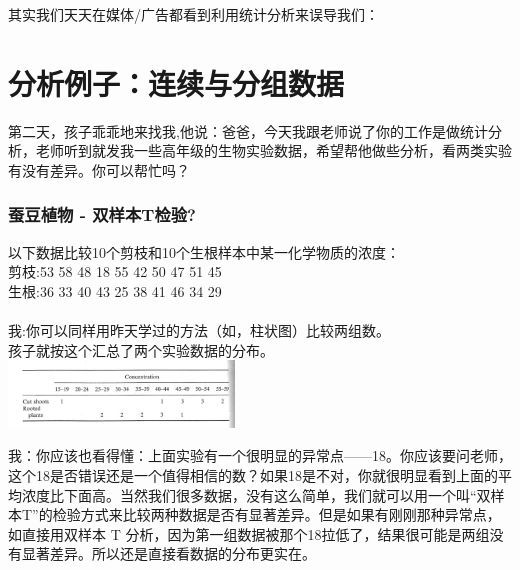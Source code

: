 其实我们天天在媒体/广告都看到利用统计分析来误导我们：


\hypertarget{ux5206ux6790ux4f8bux5b50ux8fdeux7eedux4e0eux5206ux7ec4ux6570ux636e}{%
\section{分析例子：连续与分组数据}\label{ux5206ux6790ux4f8bux5b50ux8fdeux7eedux4e0eux5206ux7ec4ux6570ux636e}}

第二天，孩子乖乖地来找我,他说：爸爸，今天我跟老师说了你的工作是做统计分析，老师听到就发我一些高年级的生物实验数据，希望帮他做些分析，看两类实验有没有差异。你可以帮忙吗？\\

\hypertarget{ux8695ux8c46ux690dux7269---ux53ccux6837ux672ctux68c0ux9a8c}{%
\subsubsection{蚕豆植物 -
双样本T检验?}\label{ux8695ux8c46ux690dux7269---ux53ccux6837ux672ctux68c0ux9a8c}}

以下数据比较10个剪枝和10个生根样本中某一化学物质的浓度：\\
剪枝:53 58 48 18 55 42 50 47 51 45\\
生根:36 33 40 43 25 38 41 46 34 29\\
~\\
我:你可以同样用昨天学过的方法（如，柱状图）比较两组数。\\
孩子就按这个汇总了两个实验数据的分布。\\

\includegraphics[width=6cm]{图片61-1.png}

我：你应该也看得懂：上面实验有一个很明显的异常点------18。你应该要问老师，这个18是否错误还是一个值得相信的数？如果18是不对，你就很明显看到上面的平均浓度比下面高。当然我们很多数据，没有这么简单，我们就可以用一个叫``双样本T''的检验方式来比较两种数据是否有显著差异。但是如果有刚刚那种异常点，如直接用双样本
T
分析，因为第一组数据被那个18拉低了，结果很可能是两组没有显著差异。所以还是直接看数据的分布更实在。

